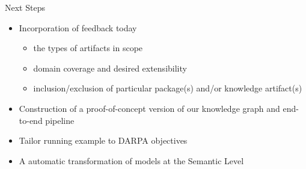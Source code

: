 \documentclass[ignorenonframetext,]{beamer}
\providecommand{\tightlist}{%
  \setlength{\itemsep}{0pt}\setlength{\parskip}{0pt}}
\begin{document}
\begin{frame}{Next Steps}
\protect\hypertarget{next-steps}{}

\begin{itemize}
\tightlist
\item
  Incorporation of feedback today

  \begin{itemize}
  \tightlist
  \item
    the types of artifacts in scope
  \item
    domain coverage and desired extensibility
  \item
    inclusion/exclusion of particular package(s) and/or knowledge
    artifact(s)
  \end{itemize}
\item
  Construction of a proof-of-concept version of our knowledge graph and
  end-to-end pipeline
\item
  Tailor running example to DARPA objectives
\item
  A automatic transformation of models at the Semantic Level
\end{itemize}

\end{frame}
\end{document}
